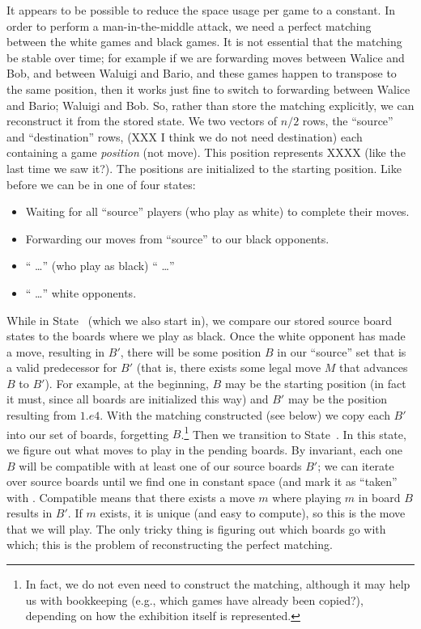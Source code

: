 \documentclass[twocolumn]{amsart}
\begin{document}
It appears to be possible to reduce the space usage per game to a
constant. In order to perform a man-in-the-middle attack, we need
a perfect matching between the white games and black games. It is
not essential that the matching be stable over time; for example
if we are forwarding moves between Walice and Bob, and between
Waluigi and Bario, and these games happen to transpose to the same
position, then it works just fine to switch to forwarding between
Walice and Bario; Waluigi and Bob. So, rather than store the
matching explicitly, we can reconstruct it from the stored state.
We two vectors of $n/2$ rows, the ``source'' and ``destination'' rows,  (XXX I think we do not need destination)
each containing a game {\em position} (not move).
This position represents XXXX (like the last time we saw it?).
The positions are initialized to the starting position. Like before
we can be in one of four states:
\begin{itemize}
\item Waiting for all ``source'' players (who play as white) to complete their moves. \label{state:cmim1}
\item Forwarding our moves from ``source'' to our black opponents. \label{state:cmim2}
\item `` \ldots '' (who play as black) `` \ldots '' \label{state:cmim3}
\item `` \ldots '' white opponents. \label{state:cmim3}
\end{itemize}

\newcommand\stepsto[1]{\stackrel{#1}{\rightarrow}}

While in State~\label{state:cmim1} (which we also start in), we
compare our stored source board states to the boards where we play as
black. Once the white opponent has made a move, resulting in $B'$,
there will be some position $B$ in our ``source'' set that is a valid
predecessor for $B'$ (that is, there exists some legal move $M$ that
advances $B$ to $B'$). For example, at the beginning, $B$ may be the
starting position (in fact it must, since all boards are initialized
this way) and $B'$ may be the position resulting from $1. e4$. With
the matching constructed (see below) we copy each $B'$ into our set of
boards, forgetting $B$.\footnote{In fact, we do not even need to
  construct the matching, although it may help us with bookkeeping
  (e.g., which games have already been copied?), depending on how the
  exhibition itself is represented.} Then we transition to
State~\label{state:cmim2}. In this state, we figure out what moves to
play in the pending boards. By invariant, each one $B$ will be
compatible with at least one of our source boards $B'$; we can iterate
over source boards until we find one in constant space (and mark it
as ``taken'' with . Compatible
means that there exists a move $m$ where playing $m$ in board $B$
results in $B'$. If $m$ exists, it is unique (and easy to compute), so
this is the move that we will play. The only tricky thing is figuring
out which boards go with which; this is the problem of reconstructing
the perfect matching.
\end{document}
